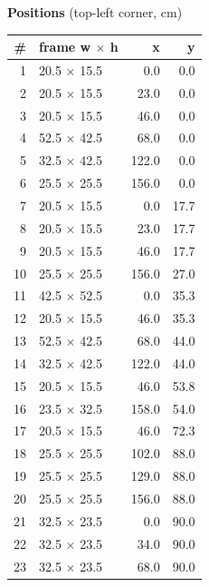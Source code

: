 \documentclass[a4paper,landscape,10pt]{article}
\begin{document}
\begin{minipage}[t]{0.25\textwidth}
\vspace{8pt}
{\bfseries Positions} (top-left corner, cm)\\[2pt]
\tiny
\begin{tabular}{@{}r l r r@{}}
\toprule
\# & frame w $\times$ h & x & y \\
\midrule
1 & 20.5 $\times$ 15.5 & 0.0 & 0.0 \\
2 & 20.5 $\times$ 15.5 & 23.0 & 0.0 \\
3 & 20.5 $\times$ 15.5 & 46.0 & 0.0 \\
4 & 52.5 $\times$ 42.5 & 68.0 & 0.0 \\
5 & 32.5 $\times$ 42.5 & 122.0 & 0.0 \\
6 & 25.5 $\times$ 25.5 & 156.0 & 0.0 \\
7 & 20.5 $\times$ 15.5 & 0.0 & 17.7 \\
8 & 20.5 $\times$ 15.5 & 23.0 & 17.7 \\
9 & 20.5 $\times$ 15.5 & 46.0 & 17.7 \\
10 & 25.5 $\times$ 25.5 & 156.0 & 27.0 \\
11 & 42.5 $\times$ 52.5 & 0.0 & 35.3 \\
12 & 20.5 $\times$ 15.5 & 46.0 & 35.3 \\
13 & 52.5 $\times$ 42.5 & 68.0 & 44.0 \\
14 & 32.5 $\times$ 42.5 & 122.0 & 44.0 \\
15 & 20.5 $\times$ 15.5 & 46.0 & 53.8 \\
16 & 23.5 $\times$ 32.5 & 158.0 & 54.0 \\
17 & 20.5 $\times$ 15.5 & 46.0 & 72.3 \\
18 & 25.5 $\times$ 25.5 & 102.0 & 88.0 \\
19 & 25.5 $\times$ 25.5 & 129.0 & 88.0 \\
20 & 25.5 $\times$ 25.5 & 156.0 & 88.0 \\
21 & 32.5 $\times$ 23.5 & 0.0 & 90.0 \\
22 & 32.5 $\times$ 23.5 & 34.0 & 90.0 \\
23 & 32.5 $\times$ 23.5 & 68.0 & 90.0 \\
\bottomrule
\end{tabular}
\end{minipage}
\clearpage
\end{document}
